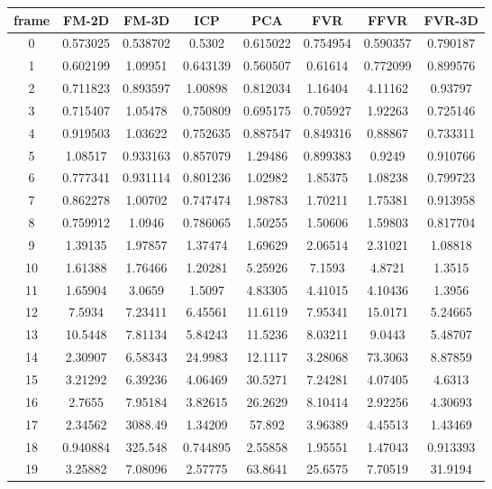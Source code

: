 \begin{figure}
\centering
\begin{tabular}{cccccccc}
\hline
\textbf{frame} & \textbf{FM-2D} & \textbf{FM-3D} & \textbf{ICP} & \textbf{PCA} & \textbf{FVR} & \textbf{FFVR} & \textbf{FVR-3D}
\\ \hline
0 & 0.573025 & 0.538702 & 0.5302 & 0.615022 & 0.754954 & 0.590357 & 0.790187\\
1 & 0.602199 & 1.09951 & 0.643139 & 0.560507 & 0.61614 & 0.772099 & 0.899576\\
2 & 0.711823 & 0.893597 & 1.00898 & 0.812034 & 1.16404 & 4.11162 & 0.93797\\
3 & 0.715407 & 1.05478 & 0.750809 & 0.695175 & 0.705927 & 1.92263 & 0.725146\\
4 & 0.919503 & 1.03622 & 0.752635 & 0.887547 & 0.849316 & 0.88867 & 0.733311\\
5 & 1.08517 & 0.933163 & 0.857079 & 1.29486 & 0.899383 & 0.9249 & 0.910766\\
6 & 0.777341 & 0.931114 & 0.801236 & 1.02982 & 1.85375 & 1.08238 & 0.799723\\
7 & 0.862278 & 1.00702 & 0.747474 & 1.98783 & 1.70211 & 1.75381 & 0.913958\\
8 & 0.759912 & 1.0946 & 0.786065 & 1.50255 & 1.50606 & 1.59803 & 0.817704\\
9 & 1.39135 & 1.97857 & 1.37474 & 1.69629 & 2.06514 & 2.31021 & 1.08818\\
10 & 1.61388 & 1.76466 & 1.20281 & 5.25926 & 7.1593 & 4.8721 & 1.3515\\
11 & 1.65904 & 3.0659 & 1.5097 & 4.83305 & 4.41015 & 4.10436 & 1.3956\\
12 & 7.5934 & 7.23411 & 6.45561 & 11.6119 & 7.95341 & 15.0171 & 5.24665\\
13 & 10.5448 & 7.81134 & 5.84243 & 11.5236 & 8.03211 & 9.0443 & 5.48707\\
14 & 2.30907 & 6.58343 & 24.9983 & 12.1117 & 3.28068 & 73.3063 & 8.87859\\
15 & 3.21292 & 6.39236 & 4.06469 & 30.5271 & 7.24281 & 4.07405 & 4.6313\\
16 & 2.7655 & 7.95184 & 3.82615 & 26.2629 & 8.10414 & 2.92256 & 4.30693\\
17 & 2.34562 & 3088.49 & 1.34209 & 57.892 & 3.96389 & 4.45513 & 1.43469\\
18 & 0.940884 & 325.548 & 0.744895 & 2.55858 & 1.95551 & 1.47043 & 0.913393\\
19 & 3.25882 & 7.08096 & 2.57775 & 63.8641 & 25.6575 & 7.70519 & 31.9194\\

\end{tabular}
\end{figure}
